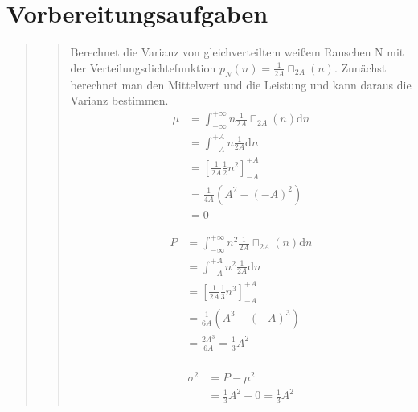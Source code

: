 %     





\section{Vorbereitungsaufgaben}
\begin{quote}

    \begin{quote}
    Berechnet die Varianz von gleichverteiltem weißem Rauschen N mit der
    Verteilungsdichtefunktion $p_{N}(n)=\frac{1}{2A}\sqcap_{2A}(n)$. Zunächst
    berechnet man den Mittelwert und die Leistung und kann daraus die Varianz
    bestimmen.
    \begin{equation*}
     \begin{split}
     \mu &= \int_{-\infty}^{+\infty} n \frac{1}{2A} \sqcap_{2A} (n) \mathrm dn\\
     &= \int_{-A}^{+A} n \frac{1}{2A} \mathrm dn\\
     &= \left[ \frac{1}{2A} \frac{1}{2} n^2 \right]_{-A}^{+A}\\
     &= \frac{1}{4A} (A^2-(-A)^2)\\
     &= 0
     \end{split}
    \end{equation*}
    
    \begin{equation*}
     \begin{split}
     P &= \int_{-\infty}^{+\infty} n^2 \frac{1}{2A} \sqcap_{2A} (n) \mathrm dn\\
     &= \int_{-A}^{+A} n^2 \frac{1}{2A} \mathrm dn\\
     &= \left[ \frac{1}{2A} \frac{1}{3} n^3 \right]_{-A}^{+A}\\
     &= \frac{1}{6A} (A^3-(-A)^3)\\
            &= \frac{2A^3}{6A} = \frac{1}{3} A^2\\
     \end{split}
    \end{equation*}
    
    \begin{equation*}
     \begin{split}
     \sigma^2 &= P - \mu^2\\
     &= \frac{1}{3} A^2 - 0 = \frac{1}{3} A^2
     \end{split}
    \end{equation*}
\end{quote}




\end{quote}
